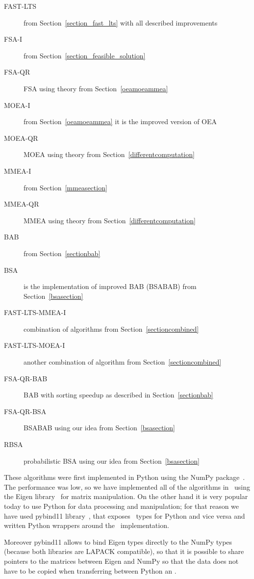 \begin{description}
    \item[FAST-LTS] from Section~\ref{section_fast_lts} with all described improvements
    \item[FSA-I] from Section~\ref{section_feasible_solution}
    \item[FSA-QR] FSA using theory from Section~\ref{oeamoeammea}
    \item[MOEA-I] from Section~\ref{oeamoeammea} it is the improved version of OEA
    \item[MOEA-QR] MOEA using theory from Section~\ref{differentcomputation}
    \item[MMEA-I] from Section~\ref{mmeasection}
    \item[MMEA-QR] MMEA using theory from Section~\ref{differentcomputation}
    \item[BAB] from Section~\ref{sectionbab}
    \item[BSA] is the implementation of improved BAB (BSABAB) from Section~\ref{bsasection}
    \item[FAST-LTS-MMEA-I] combination of algorithms from Section~\ref{sectioncombined}
    \item[FAST-LTS-MOEA-I] another combination of algorithm from Section~\ref{sectioncombined}
    \item[FSA-QR-BAB] BAB with sorting speedup as described in Section~\ref{sectionbab}
    \item[FSA-QR-BSA] BSABAB using our idea from Section~\ref{bsasection}
    \item[RBSA] probabilistic BSA using our idea from Section~\ref{bsasection}
\end{description}

These algorithms were first implemented in Python using the NumPy package~\cite{numpy}. The performance was low, so we have implemented all of the algorithms in \CC \ using the Eigen library~\cite{eigenweb} for matrix manipulation. On the other hand it is very popular today to use Python for data processing and manipulation; for that reason we have used pybind11 library~\cite{pybind11}, that exposes \CC \ types for Python and vice versa and written Python wrappers around the \CC \ implementation. 

Moreover pybind11 allows to bind Eigen types directly to the NumPy types (because both libraries are LAPACK compatible), so that it is possible to share pointers to the matrices between Eigen and NumPy so that the data does not have to be copied when transferring between Python an \CC.

